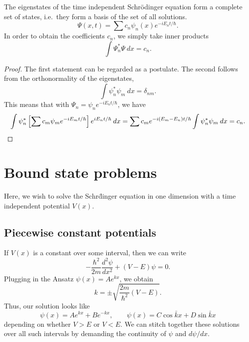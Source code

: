 \documentclass[11pt]{article}
\newcommand\dd[3][]{\frac{d^{#1}{#2}}{d {#3}^{#1}}}
\theoremstyle{definition}
\theoremstyle{remark}
\numberwithin{equation}{section}
\begin{document}
    \begin{theorem}
        The eigenstates of the time independent Schr\"odinger equation form a
        complete set of states, i.e.\ they form a basis of the set of all
        solutions. \[
            \Psi(x, t) = \sum c_n \psi_n(x) e^{-i E_n t/\hbar}.
        \] In order to obtain the coefficients $c_n$, we simply take inner products
        \[
            \int \Psi_n^*\Psi\:dx = c_n.
        \] 
    \end{theorem}
    \begin{proof}
        The first statement can be regarded as a postulate. The second follows from
        the orthonormality of the eigenstates, \[
            \int \psi_n^*\psi_m\:dx = \delta_{nm}.
        \] This means that with $\Psi_n = \psi_n e^{-iE_n t / \hbar}$, we have \[
            \int \psi_n^* \left[\sum c_m\psi_m e^{-i E_m t /\hbar}\right]e^{i E_n t
            / \hbar}\:dx = 
            \sum c_me^{-i (E_m - E_n) t / \hbar}\int \psi_n^*\psi_m\:dx = c_n.
            \qedhere
        \] 
    \end{proof}


    \section{Bound state problems}
    Here, we wish to solve the Schr\"dinger equation in one dimension with a time
    independent potential $V(x)$.

    \subsection{Piecewise constant potentials}
    If $V(x)$ is a constant over some interval, then we can write \[
        -\frac{\hbar^2}{2m}\dd[2]{\psi}{x} + (V - E)\psi = 0.
    \] Plugging in the Ansatz $\psi(x) = Ae^{kx}$, we obtain \[
        k = \pm\sqrt{\frac{2m}{\hbar^2}(V - E)}.
    \] Thus, our solution looks like \[
        \psi(x) = Ae^{kx} + Be^{-kx}, \qquad 
        \psi(x) = C\cos{\bar{k}x} + D\sin{\bar{k}x}
    \] depending on whether $V > E$ or $V < E$.
    We can stitch together these solutions over all such intervals by demanding the
    continuity of $\psi$ and $d\psi /dx$.
\end{document}
